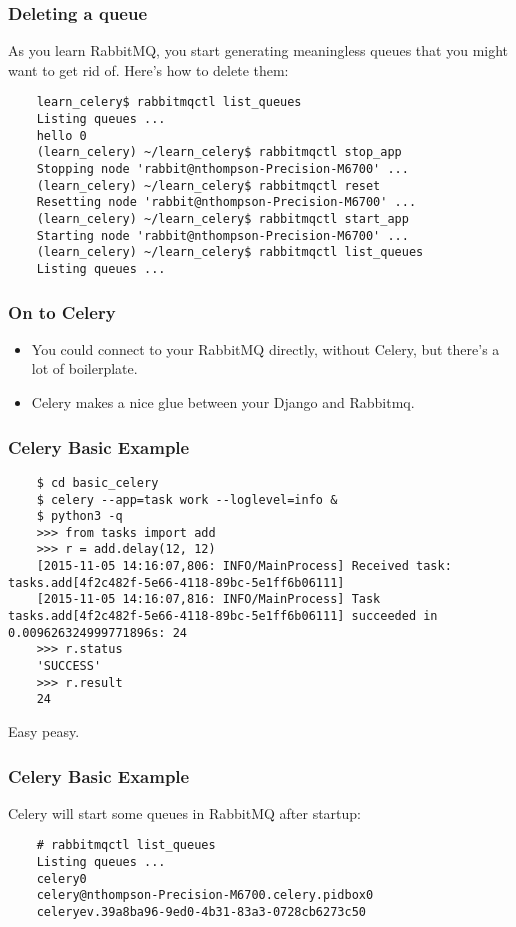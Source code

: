 \documentclass[9pt]{beamer}
\begin{document}
\begin{frame}[fragile]
  \frametitle{Deleting a queue}
  As you learn RabbitMQ, you start generating meaningless queues that you might want to get rid of. Here's how to delete them:
  \begin{verbatim}
    learn_celery$ rabbitmqctl list_queues
    Listing queues ...
    hello 0
    (learn_celery) ~/learn_celery$ rabbitmqctl stop_app
    Stopping node 'rabbit@nthompson-Precision-M6700' ...
    (learn_celery) ~/learn_celery$ rabbitmqctl reset
    Resetting node 'rabbit@nthompson-Precision-M6700' ...
    (learn_celery) ~/learn_celery$ rabbitmqctl start_app
    Starting node 'rabbit@nthompson-Precision-M6700' ...
    (learn_celery) ~/learn_celery$ rabbitmqctl list_queues
    Listing queues ...
  \end{verbatim}
\end{frame}

\begin{frame}[fragile]
  \frametitle{On to Celery}
  \begin{itemize}
  \item You could connect to your RabbitMQ directly, without Celery, but there's a lot of boilerplate.
  \item Celery makes a nice glue between your Django and Rabbitmq.
  \end{itemize}
\end{frame}

\begin{frame}[fragile]
  \frametitle{Celery Basic Example}
  \begin{verbatim}
    $ cd basic_celery
    $ celery --app=task work --loglevel=info &
    $ python3 -q
    >>> from tasks import add
    >>> r = add.delay(12, 12)
    [2015-11-05 14:16:07,806: INFO/MainProcess] Received task: tasks.add[4f2c482f-5e66-4118-89bc-5e1ff6b06111]
    [2015-11-05 14:16:07,816: INFO/MainProcess] Task tasks.add[4f2c482f-5e66-4118-89bc-5e1ff6b06111] succeeded in 0.009626324999771896s: 24
    >>> r.status
    'SUCCESS'
    >>> r.result
    24
  \end{verbatim}
  Easy peasy.
\end{frame}

\begin{frame}[fragile]
  \frametitle{Celery Basic Example}
  Celery will start some queues in RabbitMQ after startup:
  \begin{verbatim}
    # rabbitmqctl list_queues
    Listing queues ...
    celery0
    celery@nthompson-Precision-M6700.celery.pidbox0
    celeryev.39a8ba96-9ed0-4b31-83a3-0728cb6273c50
  \end{verbatim}
\end{frame}
\end{document}
